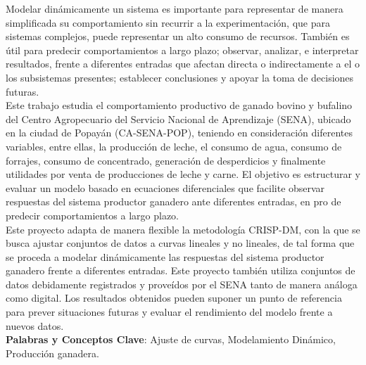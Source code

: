 
Modelar dinámicamente un sistema es importante para representar de manera simplificada su comportamiento sin recurrir a la experimentación, que para sistemas complejos, puede representar un alto consumo de recursos. También es útil para predecir comportamientos a largo plazo; observar, analizar, e interpretar resultados, frente a diferentes entradas que afectan directa o indirectamente a el o los subsistemas presentes; establecer conclusiones y apoyar la toma de decisiones futuras.\\
%

Este trabajo estudia el comportamiento productivo de ganado bovino y bufalino del Centro Agropecuario del Servicio Nacional de Aprendizaje (SENA), ubicado en la ciudad de Popayán (CA-SENA-POP), teniendo en consideración diferentes variables, entre ellas, la producción de leche, el consumo de agua, consumo de forrajes, consumo de concentrado, generación de desperdicios y finalmente utilidades por venta de producciones de leche y carne. El objetivo es estructurar y evaluar un modelo basado en ecuaciones diferenciales que facilite observar respuestas del sistema productor ganadero ante diferentes entradas, en pro de predecir comportamientos a largo plazo.\\

Este proyecto adapta de manera flexible la metodología CRISP-DM, con la que se busca ajustar conjuntos de datos a curvas lineales y no lineales, de tal forma que se proceda a modelar dinámicamente las respuestas del sistema productor ganadero frente a diferentes entradas. Este proyecto también utiliza conjuntos de datos debidamente registrados y proveídos por el SENA tanto de manera análoga como digital. Los resultados obtenidos pueden suponer un punto de referencia para prever situaciones futuras y evaluar el rendimiento del modelo frente a nuevos datos.\\

{\bf Palabras y Conceptos Clave}: Ajuste de curvas, Modelamiento Dinámico, Producción ganadera.
